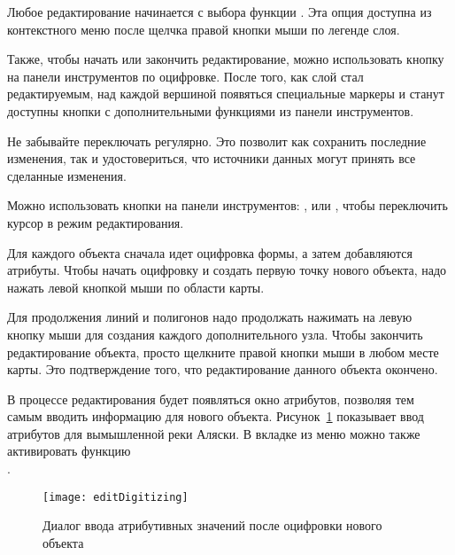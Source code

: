 Любое редактирование начинается с выбора функции
.
Эта опция доступна из контекстного меню после щелчка правой кнопки мыши
по легенде слоя.

Также, чтобы начать или закончить редактирование, можно использовать
кнопку 
 на панели инструментов
по оцифровке. После того, как слой стал редактируемым,
над каждой вершиной появяться специальные маркеры и станут доступны кнопки
с дополнительными функциями из панели инструментов.

\begin{Tip}\caption{\textsc{Регулярное сохранение}}
Не забывайте переключать 
регулярно. Это позволит как сохранить последние изменения, так и удостовериться,
что источники данных могут принять все сделанные изменения.
\end{Tip}


Можно использовать кнопки на панели инструментов:
,
 или
, чтобы переключить \qg
курсор в режим редактирования.

Для каждого объекта сначала идет оцифровка формы, а затем добавляются атрибуты.
Чтобы начать оцифровку и создать первую точку нового объекта, надо нажать
левой кнопкой мыши по области карты.

Для продолжения линий и полигонов надо продолжать нажимать на левую кнопку
мыши для создания каждого дополнительного узла. Чтобы закончить
редактирование объекта, просто щелкните правой кнопки мыши в любом
месте карты. Это подтверждение того, что редактирование данного объекта
окончено.

В процессе редактирования будет появляться окно атрибутов, позволяя тем
самым вводить информацию для нового объекта.
Рисунок~\ref{fig:vector_digitising} показывает ввод атрибутов для вымышленной реки
Аляски. В вкладке  из меню  \arrow
{} можно также активировать функцию \\
.

\begin{figure}[ht]
   \centering
   \texttt{[image: editDigitizing]}
   \caption{Диалог ввода атрибутивных значений после оцифровки нового объекта \nixcaption}\label{fig:vector_digitising}
 \end{figure}

